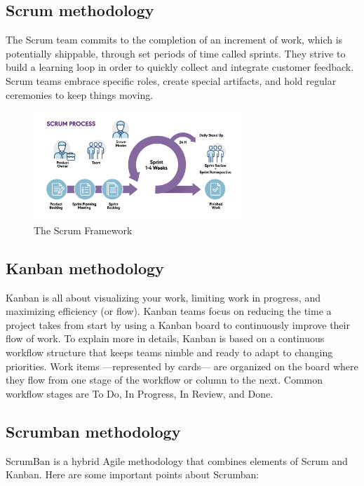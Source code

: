\subsection{Scrum methodology}
The Scrum team commits to the completion of an increment of work, which is potentially shippable, through set periods of time called sprints.
They strive to build a learning loop in order to quickly collect and integrate customer feedback.
Scrum teams embrace specific roles, create special artifacts, and hold regular ceremonies to keep things moving.


\begin{figure}[H]
    \centering
    \includegraphics[width=0.7\textwidth]{src/assets/chapters/blog-scrum-process-opt.jpg}
    \caption{The Scrum Framework}
    \label{fig:Scrum_Framework_image}
\end{figure}


\subsection{Kanban methodology}
Kanban is all about visualizing your work, limiting work in progress, and maximizing efficiency (or flow).
Kanban teams focus on reducing the time a project takes from start by using a Kanban board to continuously improve their flow of work.
To explain more in details, Kanban is based on a continuous workflow structure that keeps teams nimble and ready to adapt to changing priorities.
Work items —represented by cards— are organized on the board where they flow from one stage of the workflow or column to the next.
Common workflow stages are To Do, In Progress, In Review, and Done.

\subsection{Scrumban methodology}
ScrumBan is a hybrid Agile methodology that combines elements of Scrum and Kanban. Here are some important points about Scrumban:


